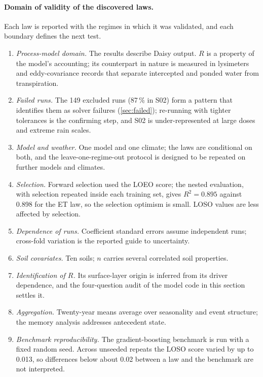 \documentclass[preprint,12pt,authoryear]{elsarticle}
\begin{document}
\paragraph{Domain of validity of the discovered laws.}
Each law is reported with the regimes in which it was validated, and each boundary defines the next test.
\begin{enumerate}[nosep]
\item \emph{Process-model domain.} The results describe Daisy output. $R$ is a property of the model's accounting; its counterpart in nature is measured in lysimeters and eddy-covariance records that separate intercepted and ponded water from transpiration.
\item \emph{Failed runs.} The 149 excluded runs (87\,\% in S02) form a pattern that identifies them as solver failures (\cref{sec:failed}); re-running with tighter tolerances is the confirming step, and S02 is under-represented at large doses and extreme rain scales.
\item \emph{Model and weather.} One model and one climate; the laws are conditional on both, and the leave-one-regime-out protocol is designed to be repeated on further models and climates.
\item \emph{Selection.} Forward selection used the LOEO score; the nested evaluation, with selection repeated inside each training set, gives $R^2=0.895$ against 0.898 for the ET law, so the selection optimism is small. LOSO values are less affected by selection.
\item \emph{Dependence of runs.} Coefficient standard errors assume independent runs; cross-fold variation is the reported guide to uncertainty.
\item \emph{Soil covariates.} Ten soils; $n$ carries several correlated soil properties.
\item \emph{Identification of $R$.} Its surface-layer origin is inferred from its driver dependence, and the four-question audit of the model code in this section settles it.
\item \emph{Aggregation.} Twenty-year means average over seasonality and event structure; the memory analysis addresses antecedent state.
\item \emph{Benchmark reproducibility.} The gradient-boosting benchmark is run with a fixed random seed. Across unseeded repeats the LOSO score varied by up to 0.013, so differences below about 0.02 between a law and the benchmark are not interpreted.
\end{enumerate}
\end{document}
